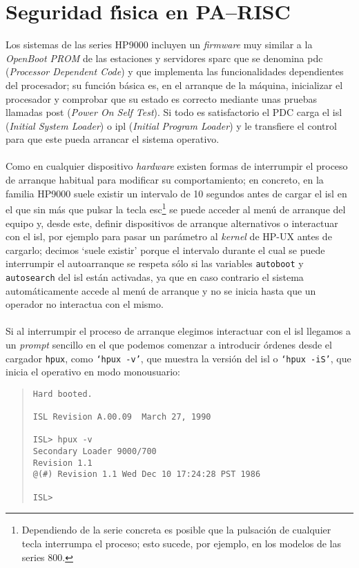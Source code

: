 \section{Seguridad f\'{\i}sica en PA--RISC}
Los sistemas de las series HP9000 incluyen un {\it firmware} muy similar a la 
{\it OpenBoot PROM} de las estaciones y servidores {\sc sparc} que se denomina 
{\sc pdc} ({\it Processor Dependent Code}) y que implementa las funcionalidades
dependientes del procesador; su funci\'on b\'asica es, en el arranque de la 
m\'aquina, inicializar el procesador y comprobar que su estado es correcto
mediante unas pruebas llamadas {\sc post} ({\it Power On Self Test}). Si todo es
satisfactorio el PDC carga el {\sc isl} ({\it Initial System Loader}) o {\sc 
ipl} ({\it Initial Program Loader}) y le transfiere el control para que este 
pueda arrancar el sistema operativo.\\
\\Como en cualquier dispositivo {\it hardware} existen formas de interrumpir el 
proceso de arranque habitual para modificar su comportamiento; en concreto, en 
la familia HP9000 suele existir un intervalo de 10 
segundos antes de cargar el {\sc isl} en el que sin m\'as que pulsar la tecla 
{\sc esc}\footnote{Dependiendo de la serie concreta es posible que la 
pulsaci\'on de cualquier tecla interrumpa el proceso; esto sucede, por ejemplo,
en los modelos de las series 800.} se puede acceder al men\'u de arranque del 
equipo y, desde este, definir dispositivos de arranque alternativos o 
interactuar con el {\sc isl}, por ejemplo para pasar un par\'ametro al {\it 
kernel} de HP-UX antes de cargarlo; decimos `suele existir' porque el intervalo
durante el cual se puede interrumpir el autoarranque se respeta s\'olo si las
variables {\tt autoboot} y {\tt autosearch} del {\sc isl} est\'an activadas, ya
que en caso contrario el sistema autom\'aticamente accede al men\'u de arranque
y no se inicia hasta que un operador no interactua con el mismo.\\
\\Si al interrumpir el proceso de arranque elegimos interactuar con el {\sc 
isl} llegamos a un {\it prompt} sencillo en el que podemos comenzar a introducir
\'ordenes desde el cargador {\tt hpux}, como {\tt `hpux -v'}, que muestra la
versi\'on del {\sc isl} o {\tt `hpux -iS'}, que inicia el operativo en modo
monousuario:
\begin{quote}
\begin{verbatim}
Hard booted.

ISL Revision A.00.09  March 27, 1990

ISL> hpux -v
Secondary Loader 9000/700
Revision 1.1
@(#) Revision 1.1 Wed Dec 10 17:24:28 PST 1986

ISL>
\end{verbatim}
\end{quote}
